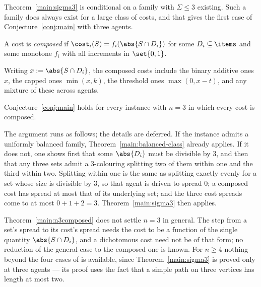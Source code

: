 Theorem~\ref{main:sigma3} is conditional on a family with $\Sigma \le 3$
existing. Such a family does always exist for a large class of costs, and that
gives the first case of Conjecture~\ref{conj:main} with three agents.

\begin{definition}
\label{main:composed}
A cost is \emph{composed} if $\cost_i(S) = f_i(\abs{S \cap D_i})$ for some
$D_i \subseteq \items$ and some monotone $f_i$ with all increments in
$\set{0,1}$.
\end{definition}

Writing $x := \abs{S \cap D_i}$, the composed costs include the binary additive
ones $x$, the capped ones $\min(x,k)$, the threshold ones $\max(0, x-t)$, and
any mixture of these across agents.

\begin{theorem}
\label{main:n3composed}
Conjecture~\ref{conj:main} holds for every instance with $n = 3$ in which every
cost is composed.
\end{theorem}

The argument runs as follows; the details are deferred. If the instance admits a
uniformly balanced family, Theorem~\ref{main:balanced-class} already applies. If
it does not, one shows first that some $\abs{D_i}$ must be divisible by $3$, and
then that any three sets admit a $3$-colouring splitting two of them within one
and the third within two. Splitting within one is the same as splitting exactly
evenly for a set whose size is divisible by $3$, so that agent is driven to
spread $0$; a composed cost has spread at most that of its underlying set; and
the three cost spreads come to at most $0 + 1 + 2 = 3$. Theorem~\ref{main:sigma3}
then applies.

\begin{remark}
\label{main:rem-spread-gap}
Theorem~\ref{main:n3composed} does not settle $n = 3$ in general. The step from
a set's spread to its cost's spread needs the cost to be a function of the single
quantity $\abs{S \cap D_i}$, and a dichotomous cost need not be of that form; no
reduction of the general case to the composed one is known. For $n \ge 4$
nothing beyond the four cases of  is available, since
Theorem~\ref{main:sigma3} is proved only at three agents --- its proof uses the
fact that a simple path on three vertices has length at most two.
\end{remark}

